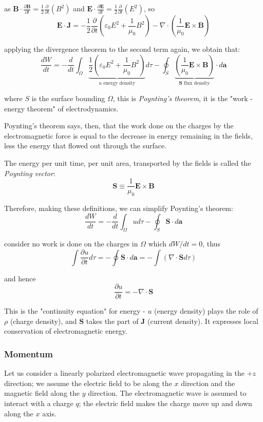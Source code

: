 \documentclass[UTF8]{book}
\begin{document}
as $\mathbf{B}\cdot \frac{\partial \mathbf{B}}{\partial t}=\frac{1}{2}\frac{\partial }{\partial t}(B^2)$ and $\mathbf{E}\cdot \frac{\partial \mathbf{E}}{\partial t}=\frac{1}{2}\frac{\partial }{\partial t}(E^2)$, so
\[\mathbf{E}\cdot \mathbf{J}=-\frac{1}{2}\frac{\partial }{\partial t}\left(\varepsilon _0E^2+\frac{1}{\mu_0}B^2\right)-\nabla \cdot (\frac{1}{\mu _0}\mathbf{E}\times \mathbf{B})\]

applying the divergence theorem to the second term again, we obtain that:
\[\frac{dW}{dt}=-\frac{d}{dt}\int _{\Omega }\underbrace{\frac{1}{2}\left(\varepsilon _0E^2+\frac{1}{\mu_0}B^2\right)}_{u\text{ energy density}}d\tau - \oint _{S}\underbrace{\left(\frac{1}{\mu _0}\mathbf{E}\times \mathbf{B}\right)}_{\mathbf{S}\text{ flux density}}\cdot d\mathbf{a}\]

where $S$ is the surface bounding $\Omega $, this is \emph{Poynting's theorem}, it is the "work - energy theorem" of electrodynamics. 

Poynting's theorem says, then, that the work done on the charges by the electromagnetic force is equal to the decrease in energy remaining in the fields, less the energy that flowed out through the surface.

The energy per unit time, per unit area, transported by the fields is called the \emph{Poynting vector}:
\[\mathbf{S}\equiv \frac{1}{\mu _0}\mathbf{E}\times \mathbf{B}\]

Therefore, making these definitions, we can simplify Poynting's theorem:
\[\frac{dW}{dt}=-\frac{d}{dt}\int _{\Omega }ud\tau - \oint _{S}\mathbf{S}\cdot d\mathbf{a}\]

consider no work is done on the charges in $\Omega $ which $dW/dt=0$, thus
\[\int \frac{\partial u}{\partial t}d\tau =-\oint \mathbf{S}\cdot d\mathbf{a}=-\int (\nabla \cdot \mathbf{S}d\tau )\]

and hence
\[\frac{\partial u}{\partial t}=-\nabla \cdot \mathbf{S}\]

This is the "continuity equation" for energy - $u$ (energy density) plays the role of $\rho $ (charge density), and $\mathbf{S}$ takes the part of $\mathbf{J}$ (current density). It expresses local conservation of electromagnetic energy. 


\subsubsection{Momentum}
Let us consider a linearly polarized electromagnetic wave propagating in the $+z$ direction; we assume the electric field to be along the $x$ direction and the magnetic field along the $y$ direction. The electromagnetic wave is assumed to interact with a charge $q$; the electric field makes the charge move up and down along the $x$ axis.
\end{document}

